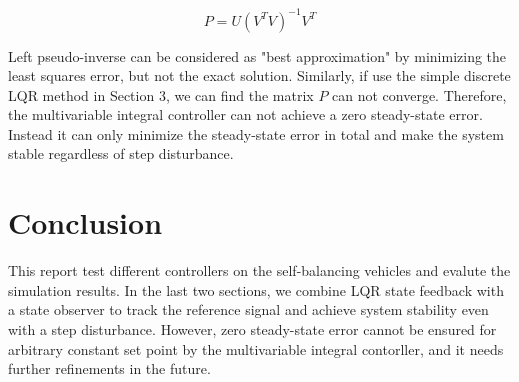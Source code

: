 \documentclass[hyperref]{article}
\theoremstyle{nonumberplain}
\begin{document}
	\begin{equation}
	P=U(V^{T}V)^{-1}V^{T}
	\label{eq49}
	\end{equation}
	
	Left pseudo-inverse can be considered as "best approximation" by minimizing the least squares error, but not the exact solution. Similarly, if use the simple discrete LQR method in Section 3, we can find the matrix $P$ can not converge. Therefore, the multivariable integral controller can not achieve a zero steady-state error. Instead it can only minimize the steady-state error in total and make the system stable regardless of step disturbance.
	
	
	\section{Conclusion}
	
	\hspace{1.0em}
	This report test different controllers on the self-balancing vehicles and evalute the simulation results. In the last two sections, we combine LQR state feedback with a state observer to track the reference signal and achieve system stability even with a step disturbance. However, zero steady-state error cannot be ensured for arbitrary constant set point by the multivariable integral contorller, and it needs further refinements in the future.
	
	
	
	
	{}
	
\end{document}

